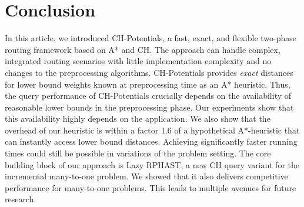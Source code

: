 \documentclass[manuscript,review]{acmart}
\begin{document}


\section{Conclusion}
\label{sec:conclusion}

In this article, we introduced CH-Potentials, a fast, exact, and flexible two-phase routing framework based on A* and CH.
The approach can handle complex, integrated routing scenarios with little implementation complexity and no changes to the preprocessing algorithms.
CH-Potentials provides \emph{exact} distances for lower bound weights known at preprocessing time as an A* heuristic.
Thus, the query performance of CH-Potentials crucially depends on the availability of reasonable lower bounds in the preprocessing phase.
Our experiments show that this availability highly depends on the application.
We also show that the overhead of our heuristic is within a factor 1.6 of a hypothetical A*-heuristic that can instantly access lower bound distances.
Achieving significantly faster running times could still be possible in variations of the problem setting.
The core building block of our approach is Lazy RPHAST, a new CH query variant for the incremental many-to-one problem.
We showed that it also delivers competitive performance for many-to-one problems.
This leads to multiple avenues for future research.
\end{document}
